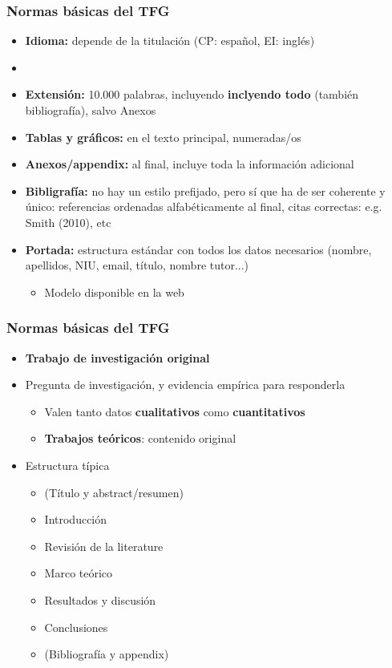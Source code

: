 \documentclass[aspectratio=43]{beamer}
\begin{document}
\begin{frame}
\frametitle{Normas básicas del TFG}
\centering

\begin{itemize}
  \item \textbf{Idioma:} depende de la titulación (CP: español, EI: inglés)
  \item[]
  \item \textbf{Extensión:} 10.000 palabras, incluyendo \textbf{inclyendo todo} (también bibliografía), salvo Anexos
  \item \textbf{Tablas y gráficos:} en el texto principal, numeradas/os
  \item \textbf{Anexos/appendix:} al final, incluye toda la información adicional
  \item \textbf{Bibligrafía:} no hay un estilo prefijado, pero sí que ha de ser coherente y único: referencias ordenadas alfabéticamente al final, citas correctas: e.g. Smith (2010), etc
  \item \textbf{Portada:} estructura estándar con todos los datos necesarios (nombre, apellidos, NIU, email, título, nombre tutor...)
  \begin{itemize}
    \item Modelo disponible en la web
  \end{itemize}
\end{itemize}

\end{frame}

\begin{frame}
\frametitle{Normas básicas del TFG}
\centering

\begin{itemize}
  \item \textbf{Trabajo de investigación original}
  \item Pregunta de investigación, y evidencia empírica para responderla
  \begin{itemize}
    \item Valen tanto datos \textbf{cualitativos} como \textbf{cuantitativos}
    \item \textbf{Trabajos teóricos}: contenido original
  \end{itemize}
  \item Estructura típica
  \begin{itemize}
    \item (Título y abstract/resumen)
    \item Introducción
    \item Revisión de la literature
    \item Marco teórico
    \item Resultados y discusión
    \item Conclusiones
    \item (Bibliografía y appendix)
  \end{itemize}
\end{itemize}

\end{frame}
\end{document}
